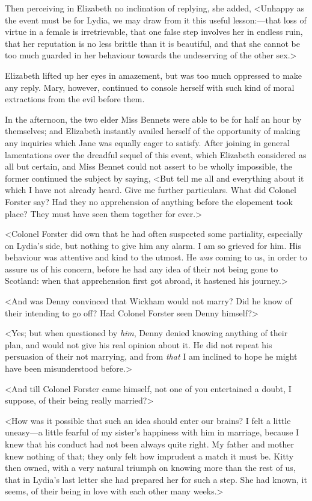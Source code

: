 Then perceiving in Elizabeth no inclination of replying, she added, <Unhappy as the event must be for Lydia, we may draw from it this useful lesson:—that loss of virtue in a female is irretrievable, that one false step involves her in endless ruin, that her reputation is no less brittle than it is beautiful, and that she cannot be too much guarded in her behaviour towards the undeserving of the other sex.>

Elizabeth lifted up her eyes in amazement, but was too much oppressed to make any reply. Mary, however, continued to console herself with such kind of moral extractions from the evil before them.

In the afternoon, the two elder Miss Bennets were able to be for half an hour by themselves; and Elizabeth instantly availed herself of the opportunity of making any inquiries which Jane was equally eager to satisfy. After joining in general lamentations over the dreadful sequel of this event, which Elizabeth considered as all but certain, and Miss Bennet could not assert to be wholly impossible, the former continued the subject by saying, <But tell me all and everything about it which I have not already heard. Give me further particulars. What did Colonel Forster say? Had they no apprehension of anything before the elopement took place? They must have seen them together for ever.>

<Colonel Forster did own that he had often suspected some partiality, especially on Lydia's side, but nothing to give him any alarm. I am so grieved for him. His behaviour was attentive and kind to the utmost. He \textit{was} coming to us, in order to assure us of his concern, before he had any idea of their not being gone to Scotland: when that apprehension first got abroad, it hastened his journey.>

<And was Denny convinced that Wickham would not marry? Did he know of their intending to go off? Had Colonel Forster seen Denny himself?>

<Yes; but when questioned by \textit{him}, Denny denied knowing anything of their plan, and would not give his real opinion about it. He did not repeat his persuasion of their not marrying, and from \textit{that} I am inclined to hope he might have been misunderstood before.>

<And till Colonel Forster came himself, not one of you entertained a doubt, I suppose, of their being really married?>

<How was it possible that such an idea should enter our brains? I felt a little uneasy—a little fearful of my sister's happiness with him in marriage, because I knew that his conduct had not been always quite right. My father and mother knew nothing of that; they only felt how imprudent a match it must be. Kitty then owned, with a very natural triumph on knowing more than the rest of us, that in Lydia's last letter she had prepared her for such a step. She had known, it seems, of their being in love with each other many weeks.>

